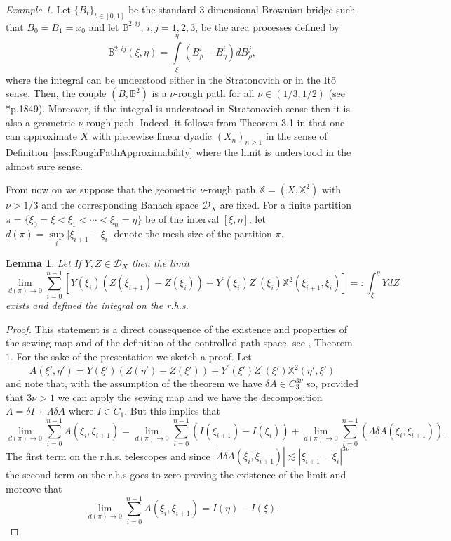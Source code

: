 \documentclass[11pt,a4paper,reqno]{amsart}%
\theoremstyle{plain}
\theoremstyle{remark}
\newtheorem{example}[theorem]{Example}
\theoremstyle{plain}
\newtheorem{lemma}[theorem]{Lemma}
\numberwithin{equation}{section}
\def\supl{\sup\limits}
\def\intl{\int\limits}
\def\supl{\mathop{\sup}\limits}
\begin{document}
\begin{example}
Let $\{B_t\}_{t\in [0,1]}$ be the standard $3$-dimensional Brownian
bridge such that $B_0=B_1=x_0$ and let $\mathbb{B}^{2,ij}$, $i,j=1,2,3$,  be the
area processes defined by
$$
\mathbb{B}^{2,ij}(\xi,\eta)=\intl_{\xi}^{\eta}(B^i_{\rho}-B^i_{\eta})dB^j_{\rho},
$$
where the integral can be understood either in the Stratonovich or in the It\^o
sense. Then, the couple $(B,\mathbb{B}^2)$ is a $\nu$-rough path for all $\nu\in(1/3,1/2)$ (see \cite{[Bess+Gub_2005]}*{p.1849}). Moreover, if the integral is understood in Stratonovich sense then it is also a
geometric $\nu$-rough path.  Indeed, it follows from Theorem
3.1 in \cite{[Friz-2005]} that one can approximate $X$ with
piecewise linear dyadic $(X_n)_{n\ge 1}$ in the sense of Definition~\ref{ass:RoughPathApproximability} where the limit is understood in the almost sure sense.
\end{example}
From now on we suppose that the geometric $\nu$-rough path
$\mathbb{X}=(X,\mathbb{X}^2)$ with $\nu>1/3$ and the corresponding Banach space
$\mathcal{D}_X$ are fixed.  For a  finite
partition $\pi=\{\xi_0=\xi<\xi_1<\cdots<\xi_n=\eta\}$ be   of the interval  $[\xi,\eta]$, let  $d(\pi)=\supl_i\vert \xi_{i+1}-\xi_i\vert $ denote the mesh size of the partition $\pi$.
\begin{lemma}\label{lem:IntegralDef}
Let  If $Y,Z\in \mathcal{D}_X$ then the limit
\begin{equation}
\lim_{d(\pi)\to
0}\sum_{i=0}^{n-1}[Y(\xi_i)(Z(\xi_{i+1})-Z(\xi_i))+Y^\prime(\xi_i)Z^\prime(\xi_i)\mathbb{X}^2(\xi_{i+1},\xi_i)] =: \int_{\xi}^{\eta}YdZ\label{eqn:IntegralDef-1}
\end{equation}
exists and defined the integral on the r.h.s.
\end{lemma}
\begin{proof}%
This statement is a direct consequence of the existence and properties of the sewing map and of the definition of the controlled path space, see \cite{[Gubinelli-2004]}, Theorem $1$. For the sake of the presentation we sketch a proof. Let
$$
A(\xi',\eta')= Y(\xi')(Z(\eta')-Z(\xi'))+Y^\prime(\xi')Z^\prime(\xi')\mathbb{X}^2(\eta',\xi')
$$
and note that, with the assumption of the theorem we have $\delta A \in C^{3\nu}_3$ so, provided that $3\nu> 1$ we can apply the sewing map and we have the decomposition
$
A = \delta I +  \Lambda \delta A
$
where $I\in C_1$. But this implies that
$$
\lim_{d(\pi)\to
0}\sum_{i=0}^{n-1} A(\xi_i,\xi_{i+1}) =\lim_{d(\pi)\to
0}\sum_{i=0}^{n-1} (I(\xi_{i+1})-I(\xi_i)) +  \lim_{d(\pi)\to
0}\sum_{i=0}^{n-1} (\Lambda \delta A(\xi_i,\xi_{i+1})).
$$
The first term on the r.h.s. telescopes and since $|\Lambda \delta A(\xi_i,\xi_{i+1})| \lesssim |\xi_{i+1}-\xi_i|^{3\nu}$ the second term on the r.h.s goes to zero proving the existence of the limit and moreove that
$$
\lim_{d(\pi)\to
0}\sum_{i=0}^{n-1} A(\xi_i,\xi_{i+1}) = I(\eta)-I(\xi).
$$
\end{proof}
\end{document}
